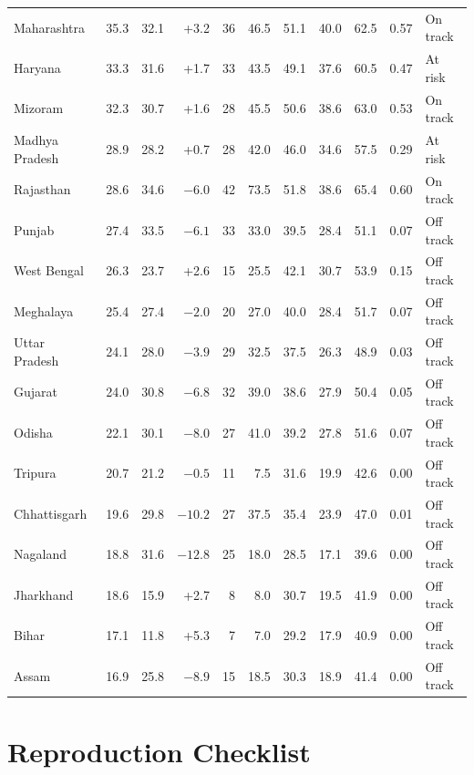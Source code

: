 \begin{table}
{\begin{tabular}{@{}lrrrrrrrrrl@{}}
Maharashtra & 35.3 & 32.1 & +3.2 & 36 & 46.5 & 51.1 & 40.0 & 62.5 & 0.57 & On track \\
Haryana & 33.3 & 31.6 & +1.7 & 33 & 43.5 & 49.1 & 37.6 & 60.5 & 0.47 & At risk \\
Mizoram & 32.3 & 30.7 & +1.6 & 28 & 45.5 & 50.6 & 38.6 & 63.0 & 0.53 & On track \\
Madhya Pradesh & 28.9 & 28.2 & +0.7 & 28 & 42.0 & 46.0 & 34.6 & 57.5 & 0.29 & At risk \\
Rajasthan & 28.6 & 34.6 & $-6.0$ & 42 & 73.5 & 51.8 & 38.6 & 65.4 & 0.60 & On track \\
Punjab & 27.4 & 33.5 & $-6.1$ & 33 & 33.0 & 39.5 & 28.4 & 51.1 & 0.07 & Off track \\
West Bengal & 26.3 & 23.7 & +2.6 & 15 & 25.5 & 42.1 & 30.7 & 53.9 & 0.15 & Off track \\
Meghalaya & 25.4 & 27.4 & $-2.0$ & 20 & 27.0 & 40.0 & 28.4 & 51.7 & 0.07 & Off track \\
Uttar Pradesh & 24.1 & 28.0 & $-3.9$ & 29 & 32.5 & 37.5 & 26.3 & 48.9 & 0.03 & Off track \\
Gujarat & 24.0 & 30.8 & $-6.8$ & 32 & 39.0 & 38.6 & 27.9 & 50.4 & 0.05 & Off track \\
Odisha & 22.1 & 30.1 & $-8.0$ & 27 & 41.0 & 39.2 & 27.8 & 51.6 & 0.07 & Off track \\
Tripura & 20.7 & 21.2 & $-0.5$ & 11 & 7.5 & 31.6 & 19.9 & 42.6 & 0.00 & Off track \\
Chhattisgarh & 19.6 & 29.8 & $-10.2$ & 27 & 37.5 & 35.4 & 23.9 & 47.0 & 0.01 & Off track \\
Nagaland & 18.8 & 31.6 & $-12.8$ & 25 & 18.0 & 28.5 & 17.1 & 39.6 & 0.00 & Off track \\
Jharkhand & 18.6 & 15.9 & +2.7 & 8 & 8.0 & 30.7 & 19.5 & 41.9 & 0.00 & Off track \\
Bihar & 17.1 & 11.8 & +5.3 & 7 & 7.0 & 29.2 & 17.9 & 40.9 & 0.00 & Off track \\
Assam & 16.9 & 25.8 & $-8.9$ & 15 & 18.5 & 30.3 & 18.9 & 41.4 & 0.00 & Off track \\
\bottomrule
\end{tabular}}
\end{table}

\section{Reproduction Checklist}

